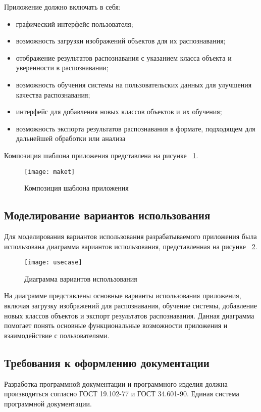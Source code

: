 Приложение должно включать в себя:
\begin{itemize}
    \item графический интерфейс пользователя;
    \item возможность загрузки изображений объектов для их распознавания;
    \item отображение результатов распознавания с указанием класса объекта и уверенности в распознавании;
    \item возможность обучения системы на пользовательских данных для улучшения качества распознавания;
    \item интерфейс для добавления новых классов объектов и их обучения;
    \item возможность экспорта результатов распознавания в формате, подходящем для дальнейшей обработки или анализа
\end{itemize}

Композиция шаблона приложения представлена на рисунке ~\ref{maket:image}.

\begin{figure}[ht]
\texttt{[image: maket]}
\caption{Композиция шаблона приложения}
\label{maket:image}
\end{figure}

\subsection{Моделирование вариантов использования}

Для моделирования вариантов использования разрабатываемого приложения была использована диаграмма вариантов использования, представленная на рисунке ~\ref{usecase:image}.

\begin{figure}[ht]
\centering
\texttt{[image: usecase]}
\caption{Диаграмма вариантов использования}
\label{usecase:image}
\end{figure}

На диаграмме представлены основные варианты использования приложения, включая загрузку изображений для распознавания, обучение системы, добавление новых классов объектов и экспорт результатов распознавания. Данная диаграмма помогает понять основные функциональные возможности приложения и взаимодействие с пользователями.

\subsection{Требования к оформлению документации}

Разработка программной документации и программного изделия должна производиться согласно ГОСТ 19.102-77 и ГОСТ 34.601-90. Единая система программной документации.
